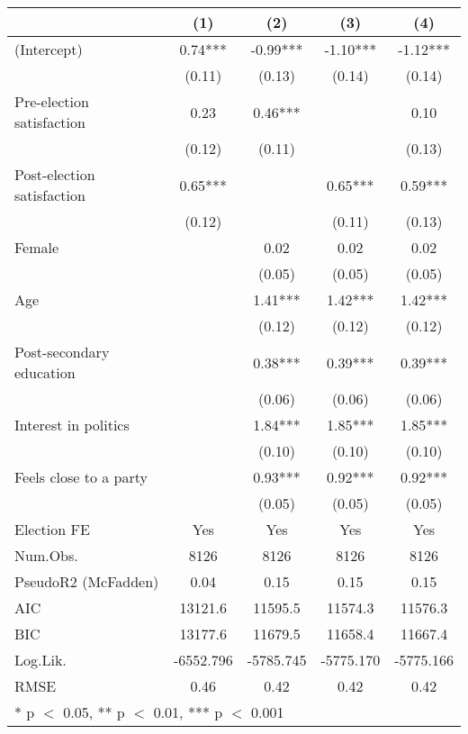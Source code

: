 \begin{table}
\centering
\begin{tabular}[t]{lcccc}
\toprule
  & (1) & (2) & (3) & (4)\\
\midrule
(Intercept) & 0.74*** & -0.99*** & -1.10*** & -1.12***\\
 & (0.11) & (0.13) & (0.14) & (0.14)\\
Pre-election satisfaction & 0.23 & 0.46*** &  & 0.10\\
 & (0.12) & (0.11) &  & (0.13)\\
Post-election satisfaction & 0.65*** &  & 0.65*** & 0.59***\\
 & (0.12) &  & (0.11) & (0.13)\\
Female &  & 0.02 & 0.02 & 0.02\\
 &  & (0.05) & (0.05) & \vphantom{1} (0.05)\\
Age &  & 1.41*** & 1.42*** & 1.42***\\
 &  & (0.12) & (0.12) & (0.12)\\
Post-secondary education &  & 0.38*** & 0.39*** & 0.39***\\
 &  & (0.06) & (0.06) & (0.06)\\
Interest in politics &  & 1.84*** & 1.85*** & 1.85***\\
 &  & (0.10) & (0.10) & (0.10)\\
Feels close to a party &  & 0.93*** & 0.92*** & 0.92***\\
 &  & (0.05) & (0.05) & (0.05)\\
\midrule
Election FE & Yes & Yes & Yes & Yes\\
Num.Obs. & 8126 & 8126 & 8126 & 8126\\
PseudoR2 (McFadden) & 0.04 & 0.15 & 0.15 & 0.15\\
AIC & 13121.6 & 11595.5 & 11574.3 & 11576.3\\
BIC & 13177.6 & 11679.5 & 11658.4 & 11667.4\\
Log.Lik. & -6552.796 & -5785.745 & -5775.170 & -5775.166\\
RMSE & 0.46 & 0.42 & 0.42 & 0.42\\
\bottomrule
\multicolumn{5}{l}{\rule{0pt}{1em}* p $<$ 0.05, ** p $<$ 0.01, *** p $<$ 0.001}\\
\end{tabular}
\end{table}
